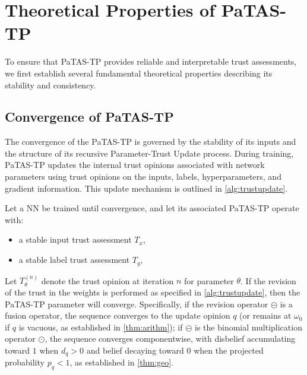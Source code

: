 \section{Theoretical Properties of \ac{PaTAS-TP}}\label{sec:ptastheory}
To ensure that \ac{PaTAS-TP} provides reliable and interpretable trust assessments, we first establish several fundamental theoretical properties describing its stability and consistency.
\subsection{Convergence of \ac{PaTAS-TP}}
\label{sec:ptas_convergence}

The convergence of the \ac{PaTAS-TP} is governed by the stability of its inputs and the structure of its recursive Parameter-Trust Update process. During training, \ac{PaTAS-TP} updates the internal trust opinions associated with network parameters using trust opinions on the inputs, labels, hyperparameters, and gradient information. This update mechanism is outlined in \cref{alg:trustupdate}. 
\begin{theorem}\label{thm:convergence}
Let a \ac{NN} be trained until convergence, and let its associated \ac{PaTAS-TP} operate with:
\begin{itemize}
    \item a stable input trust assessment $T_x$,
    \item a stable label trust assessment $T_y$,
\end{itemize}

Let $T_\theta^{(n)}$ denote the trust opinion at iteration $n$ for parameter $\theta$. If the revision of the trust in the weights is performed as specified in \cref{alg:trustupdate}, then the \ac{PaTAS-TP} parameter will converge. Specifically, if the revision operator $\circleddash$ is a fusion operator, the sequence converges to the update opinion $q$ (or remains at $\omega_0$ if $q$ is vacuous, as established in \cref{thm:arithm}); if $\circleddash$ is the binomial multiplication operator $\odot$, the sequence converges componentwise, with disbelief accumulating toward $1$ when $d_q > 0$ and belief decaying toward $0$ when the projected probability $p_q < 1$, as established in \cref{thm:geo}.
\end{theorem}


